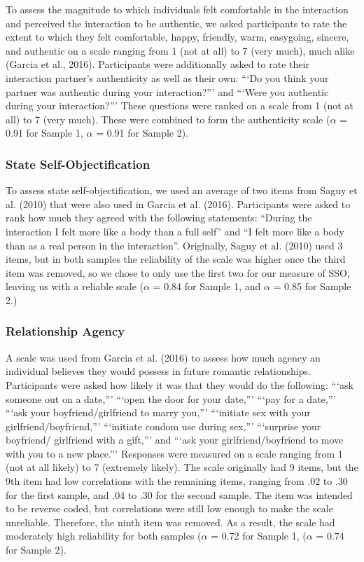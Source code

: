 \documentclass[man]{apa6}
\begin{document}
To assess the magnitude to which individuals felt comfortable in the
interaction and perceived the interaction to be authentic, we asked
participants to rate the extent to which they felt comfortable, happy,
friendly, warm, easygoing, sincere, and authentic on a scale ranging
from 1 (not at all) to 7 (very much), much alike (Garcia et al., 2016).
Participants were additionally asked to rate their interaction partner's
authenticity as well as their own: \enquote{`Do you think your partner
was authentic during your interaction?}' and \enquote{`Were you
authentic during your interaction?}' These questions were ranked on a
scale from 1 (not at all) to 7 (very much). These were combined to form
the authenticity scale (\(\alpha\) = 0.91 for Sample 1, \(\alpha\) =
0.91 for Sample 2).

\subsubsection{State
Self-Objectification}\label{state-self-objectification}

To assess state self-objectification, we used an average of two items
from Saguy et al. (2010) that were also used in Garcia et al. (2016).
Participants were asked to rank how much they agreed with the following
statements: \enquote{During the interaction I felt more like a body than
a full self} and \enquote{I felt more like a body than as a real person
in the interaction}. Originally, Saguy et al. (2010) used 3 items, but
in both samples the reliability of the scale was higher once the third
item was removed, so we chose to only use the first two for our measure
of SSO, leaving us with a reliable scale (\(\alpha\) = 0.84 for Sample
1, and \(\alpha\) = 0.85 for Sample 2.)

\subsubsection{Relationship Agency}\label{relationship-agency}

A scale was used from Garcia et al. (2016) to assess how much agency an
individual believes they would possess in future romantic relationships.
Participants were asked how likely it was that they would do the
following: \enquote{`ask someone out on a date,}' \enquote{`open the
door for your date,}' \enquote{`pay for a date,}' \enquote{`ask your
boyfriend/girlfriend to marry you,}' \enquote{`initiate sex with your
girlfriend/boyfriend,}' \enquote{`initiate condom use during sex,}'
\enquote{`surprise your boyfriend/ girlfriend with a gift,}' and
\enquote{`ask your girlfriend/boyfriend to move with you to a new
place.}' Responses were measured on a scale ranging from 1 (not at all
likely) to 7 (extremely likely). The scale originally had 9 items, but
the 9th item had low correlations with the remaining items, ranging from
.02 to .30 for the first sample, and .04 to .30 for the second sample.
The item was intended to be reverse coded, but correlations were still
low enough to make the scale unreliable. Therefore, the ninth item was
removed. As a result, the scale had moderately high reliability for both
samples (\(\alpha\) = 0.72 for Sample 1, (\(\alpha\) = 0.74 for Sample
2).
\end{document}
